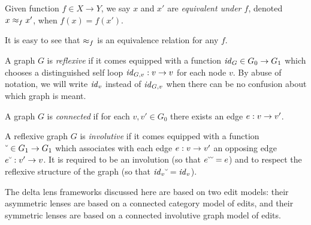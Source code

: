 \begin{definition}
    Given function $f \in X \to Y$, we say $x$ and $x'$ are \emph{equivalent
    under $f$}, denoted $x \approx_f x'$, when $f(x)=f(x')$.
\end{definition}

It is easy to see that $\approx_f$ is an equivalence relation for any $f$.

\begin{definition}
    A graph $G$ is \emph{reflexive} if it comes equipped with a function
    $\mathit{id}_G \in G_0 \to G_1$ which chooses a distinguished self loop
    $\mathit{id}_{G,v} : v \to v$ for each node $v$. By abuse of notation, we
    will write $\mathit{id}_v$ instead of $\mathit{id}_{G,v}$ when there can be no confusion
    about which graph is meant.
\end{definition}

\begin{definition}
    A graph $G$ is \emph{connected} if for each $v,v'\in G_0$ there exists
    an edge $e : v \to v'$.
\end{definition}

\begin{definition}
    A reflexive graph $G$ is \emph{involutive} if it comes equipped with a
    function $\breve{\ } \in G_1 \to G_1$ which associates with each edge $e : v
    \to v'$ an opposing edge $e\breve{\ } : v' \to v$. It is required to
    be an involution (so that $e\breve{\ }\breve{\ } = e$) and to respect the
    reflexive structure of the graph (so that $\mathit{id}_v\breve{\ }=\mathit{id}_v$).
\end{definition}

The delta lens frameworks discussed here are based on two edit models: their
asymmetric lenses are based on a connected category model of edits, and
their symmetric lenses are based on a connected involutive graph model of
edits.

